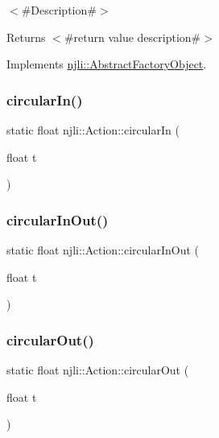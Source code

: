 $<$\#\+Description\#$>$

\begin{DoxyReturn}{Returns}
$<$\#return value description\#$>$ 
\end{DoxyReturn}


Implements \mbox{\hyperlink{classnjli_1_1_abstract_factory_object_a4763d05bc9dc37c559111f8bb30e1dd8}{njli\+::\+Abstract\+Factory\+Object}}.

\mbox{\label{classnjli_1_1_action_a56c6f671a7f57115207c14152f100460}} 
\subsubsection{\texorpdfstring{circular\+In()}{circularIn()}}
{\footnotesize\ttfamily static float njli\+::\+Action\+::circular\+In (\begin{DoxyParamCaption}\item[{float}]{t }\end{DoxyParamCaption})\hspace{0.3cm}{\ttfamily [static]}}

\mbox{\label{classnjli_1_1_action_a008a0a7853db18242a35c744c39400b6}} 
\subsubsection{\texorpdfstring{circular\+In\+Out()}{circularInOut()}}
{\footnotesize\ttfamily static float njli\+::\+Action\+::circular\+In\+Out (\begin{DoxyParamCaption}\item[{float}]{t }\end{DoxyParamCaption})\hspace{0.3cm}{\ttfamily [static]}}

\mbox{\label{classnjli_1_1_action_a742f42953df58693dd7dbf4c104e1d89}} 
\subsubsection{\texorpdfstring{circular\+Out()}{circularOut()}}
{\footnotesize\ttfamily static float njli\+::\+Action\+::circular\+Out (\begin{DoxyParamCaption}\item[{float}]{t }\end{DoxyParamCaption})\hspace{0.3cm}{\ttfamily [static]}}


